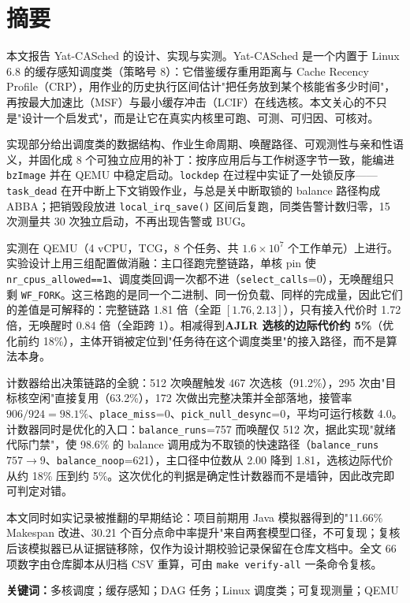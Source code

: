 \section*{摘要}

本文报告 Yat-CASched 的设计、实现与实测。Yat-CASched 是一个内置于 Linux 6.8 的缓存感知调度类（策略号 8）：它借鉴缓存重用距离与 Cache Recency Profile（CRP），用作业的历史执行区间估计"把任务放到某个核能省多少时间"，再按最大加速比（MSF）与最小缓存冲击（LCIF）在线选核。本文关心的不只是"设计一个启发式"，而是让它在真实内核里可跑、可测、可归因、可核对。

实现部分给出调度类的数据结构、作业生命周期、唤醒路径、可观测性与亲和性语义，并固化成 8 个可独立应用的补丁：按序应用后与工作树逐字节一致，能编进 \texttt{bzImage} 并在 QEMU 中稳定启动。\texttt{lockdep} 在过程中实证了一处锁反序——\texttt{task\_dead} 在开中断上下文销毁作业，与总是关中断取锁的 balance 路径构成 ABBA；把销毁段放进 \texttt{local\_irq\_save()} 区间后复跑，同类告警计数归零，15 次测量共 30 次独立启动，不再出现告警或 BUG。

实测在 QEMU（4 vCPU，TCG，8 个任务、共 $1.6\times10^7$ 个工作单元）上进行。实验设计上用三组配置做消融：主口径跑完整链路，单核 pin 使 \texttt{nr\_cpus\_allowed==1}、调度类回调一次都不进（\texttt{select\_calls}=0），无唤醒组只剩 \texttt{WF\_FORK}。这三格跑的是同一个二进制、同一份负载、同样的完成量，因此它们的差值是可解释的：完整链路 1.81 倍（全距 $[1.76,2.13]$），只有接入代价时 1.72 倍，无唤醒时 0.84 倍（全距跨 1）。相减得到\textbf{AJLR 选核的边际代价约 5\%}（优化前约 18\%），主体开销被定位到"任务待在这个调度类里"的接入路径，而不是算法本身。

计数器给出决策链路的全貌：512 次唤醒触发 467 次选核（91.2\%），295 次由"目标核空闲"直接复用（63.2\%），172 次做出完整决策并全部落地，接管率 $906/924=98.1\%$、\texttt{place\_miss}=0、\texttt{pick\_null\_desync}=0，平均可运行核数 4.0。计数器同时是优化的入口：\texttt{balance\_runs}=757 而唤醒仅 512 次，据此实现"就绪代际门禁"，使 98.6\% 的 balance 调用成为不取锁的快速路径（\texttt{balance\_runs} $757\to9$、\texttt{balance\_noop}=621），主口径中位数从 2.00 降到 1.81，选核边际代价从约 18\% 压到约 5\%。这次优化的判据是确定性计数器而不是墙钟，因此改完即可判定对错。

本文同时如实记录被推翻的早期结论：项目前期用 Java 模拟器得到的"11.66\% Makespan 改进、30.21 个百分点命中率提升"来自两套模型口径，不可复现；复核后该模拟器已从证据链移除，仅作为设计期校验记录保留在仓库文档中。全文 66 项数字由仓库脚本从归档 CSV 重算，可由 \texttt{make verify-all} 一条命令复核。

\textbf{关键词：}多核调度；缓存感知；DAG 任务；Linux 调度类；可复现测量；QEMU